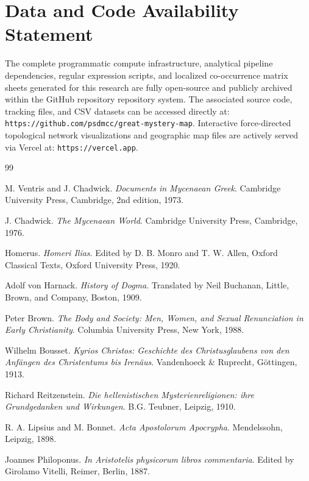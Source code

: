 \documentclass[11pt,twoside,a4paper]{article}
\begin{document}
\section*{Data and Code Availability Statement}
\label{sec:availability}
The complete programmatic compute infrastructure, analytical pipeline dependencies, regular expression scripts, and localized co-occurrence matrix sheets generated for this research are fully open-source and publicly archived within the GitHub repository repository system. The associated source code, tracking files, and CSV datasets can be accessed directly at: \texttt{https://github.com/psdmcc/great-mystery-map}. Interactive force-directed topological network visualizations and geographic map files are actively served via Vercel at: \texttt{https://vercel.app}.


\begin{thebibliography}{99}

M. Ventris and J. Chadwick. \textit{Documents in Mycenaean Greek}. Cambridge University Press, Cambridge, 2nd edition, 1973.

J. Chadwick. \textit{The Mycenaean World}. Cambridge University Press, Cambridge, 1976.

Homerus. \textit{Homeri Ilias}. Edited by D. B. Monro and T. W. Allen, Oxford Classical Texts, Oxford University Press, 1920.

Adolf von Harnack. \textit{History of Dogma}. Translated by Neil Buchanan, Little, Brown, and Company, Boston, 1909.

Peter Brown. \textit{The Body and Society: Men, Women, and Sexual Renunciation in Early Christianity}. Columbia University Press, New York, 1988.

Wilhelm Bousset. \textit{Kyrios Christos: Geschichte des Christusglaubens von den Anf\"{a}ngen des Christentums bis Iren\"{a}us}. Vandenhoeck \& Ruprecht, G{\"o}ttingen, 1913.

Richard Reitzenstein. \textit{Die hellenistischen Mysterienreligionen: ihre Grundgedanken und Wirkungen}. B.G. Teubner, Leipzig, 1910.

R. A. Lipsius and M. Bonnet. \textit{Acta Apostolorum Apocrypha}. Mendelssohn, Leipzig, 1898.

Joannes Philoponus. \textit{In Aristotelis physicorum libros commentaria}. Edited by Girolamo Vitelli, Reimer, Berlin, 1887.


\end{thebibliography}
\end{document}

